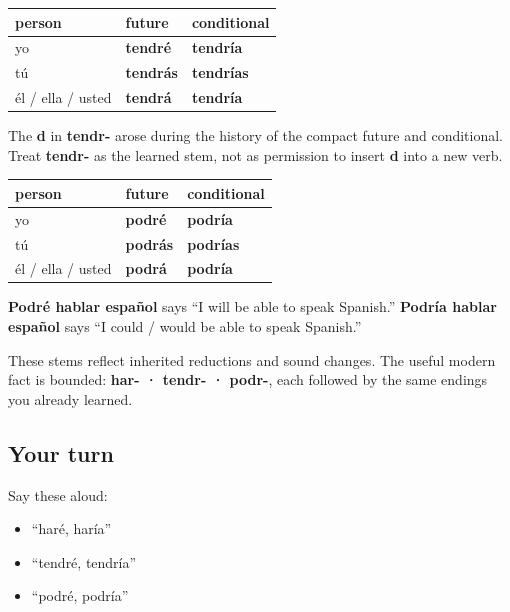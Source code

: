 \begin{grammarlens}[title={Grammar Lens: tener becomes tendr-}]
\noindent
\begin{tabularx}{\linewidth}{@{}>{\raggedright\arraybackslash}X>{\raggedright\arraybackslash}X>{\raggedright\arraybackslash}X@{}}
\toprule
\textbf{person} & \textbf{future} & \textbf{conditional} \\
\midrule
yo & \textbf{tendré} & \textbf{tendría} \\
tú & \textbf{tendrás} & \textbf{tendrías} \\
él / ella / usted & \textbf{tendrá} & \textbf{tendría} \\
\bottomrule
\end{tabularx}

The \textbf{d} in \textbf{tendr-} arose during the history of the compact future and conditional. Treat \textbf{tendr-} as the learned stem, not as permission to insert \textbf{d} into a new verb.
\end{grammarlens}

\begin{grammarlens}[title={Grammar Lens: poder becomes podr-}]
\noindent
\begin{tabularx}{\linewidth}{@{}>{\raggedright\arraybackslash}X>{\raggedright\arraybackslash}X>{\raggedright\arraybackslash}X@{}}
\toprule
\textbf{person} & \textbf{future} & \textbf{conditional} \\
\midrule
yo & \textbf{podré} & \textbf{podría} \\
tú & \textbf{podrás} & \textbf{podrías} \\
él / ella / usted & \textbf{podrá} & \textbf{podría} \\
\bottomrule
\end{tabularx}

\textbf{Podré hablar español} says “I will be able to speak Spanish.” \textbf{Podría hablar español} says “I could / would be able to speak Spanish.”

These stems reflect inherited reductions and sound changes. The useful modern fact is bounded: \textbf{har- · tendr- · podr-}, each followed by the same endings you already learned.
\end{grammarlens}

\subsection*{Your turn}
Say these aloud:

\begin{itemize}
\raggedright
  \item “haré, haría”
  \item “tendré, tendría”
  \item “podré, podría”
\end{itemize}

